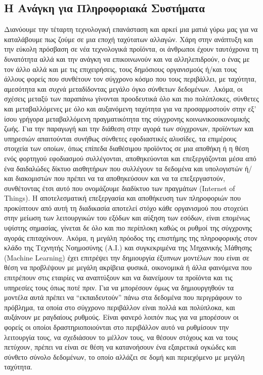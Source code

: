 \documentclass{article}
\begin{document}
\subsection{Η Ανάγκη για Πληροφοριακά Συστήματα}
Διανύουμε την τέταρτη τεχνολογική επανάσταση και αρκεί μια ματιά γύρω μας για να καταλάβουμε πως ζούμε σε μια εποχή ταχύτατων αλλαγών. Χάρη στην ανάπτυξη και την εύκολη πρόσβαση σε νέα τεχνολογικά προϊόντα, οι άνθρωποι έχουν ταυτόχρονα τη δυνατότητα αλλά και την ανάγκη να επικοινωνούν και να αλληλεπιδρούν, ο ένας με τον άλλο αλλά και με τις επιχειρήσεις, τους δημόσιους οργανισμούς ή/και τους άλλους φορείς που συνθέτουν τον σύγχρονο κόσμο που τους περιβάλλει, με ταχύτητα, αμεσότητα και συχνά μεταδίδοντας μεγάλο όγκο σύνθετων δεδομένων. Ακόμα, οι σχέσεις μεταξύ των παραπάνω γίνονται προοδευτικά όλο και πιο πολύπλοκες, σύνθετες και μεταβαλλόμενες με όλο και αυξανόμενη ταχύτητα για να προσαρμοστούν στην εξ’ ίσου γρήγορα μεταβαλλόμενη πραγματικότητα της σύγχρονης κοινωνικοοικονομικής ζωής. Για την παραγωγή και την διάθεση στην αγορά των σύγχρονων, προϊόντων και υπηρεσιών απαιτούνται συνήθως σύνθετες εφοδιαστικές αλυσίδες, τα επιμέρους στοιχεία των οποίων, όπως επίπεδα διαθέσιμου προϊόντος σε μια αποθήκη ή η θέση ενός φορτηγού εφοδιασμού συλλέγονται, αποθηκεύονται και επεξεργάζονται μέσα από ένα δαιδαλώδες δίκτυο αισθητήρων που συλλέγουν τα δεδομένα  και υπολογιστών ή/και διακομιστών που πρέπει να τα αποθηκεύσουν και να τα επεξεργαστούν, συνθέτοντας έτσι αυτό που ονομάζουμε διαδίκτυο των πραγμάτων (Internet of Things). Η αποτελεσματική επεξεργασία και αποθήκευση των πληροφοριών που προκύπτουν από αυτή τη διαδικασία αποτελεί στόχο κάθε οργανισμού που στοχεύει στην μείωση των λειτουργικών του εξόδων και αύξηση των εσόδων, είναι επομένως υψίστης σημασίας, γίνεται δε όλο και πιο περίπλοκη καθώς οι ρυθμοί της σύγχρονης αγοράς επιταχύνουν. Ακόμα, η μεγάλη πρόοδος της επιστήμης της πληροφορικής στον κλάδο της Τεχνητής Νοημοσύνης (A.I.) και συγκεκριμένα της Μηχανικής Μάθησης (Machine Learning) έχει επιτρέψει την δημιουργία έξυπνων μοντέλων που είναι σε θέση να προβλέψουν με μεγάλη ακρίβεια φυσικά, οικονομικά ή άλλα φαινόμενα που επιτρέπουν στις εταιρίες να αναπτύξουν και να διανείμουν τα προϊόντα και τις υπηρεσίες τους όπως ποτέ πριν. Για να μπορέσουν όμως να δημιουργηθούν τα μοντέλα αυτά πρέπει να “εκπαιδευτούν” πάνω στα δεδομένα που περιγράφουν το πρόβλημα, τα οποία στο σύγχρονο περιβάλλον είναι πολλά και πολύπλοκα, και αυξάνουν με ραγδαίους ρυθμούς. Είναι φανερό λοιπόν πως για να μπορέσουν οι φορείς οι οποίοι δραστηριοποιούνται στο περιβάλλον αυτό να ρυθμίσουν την λειτουργία τους, να σχεδιάσουν το μέλλον τους, να θέσουν στόχους και να τους πετύχουν, πρέπει να  είναι σε θέση να κατανοήσουν ένα εξαιρετικά ογκώδες και σύνθετο σύνολο δεδομένων, το οποίο αλλάζει σε δομή και περιεχόμενο με μεγάλη ταχύτητα.
\end{document}
